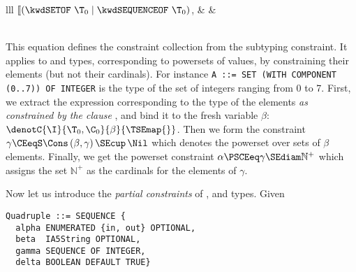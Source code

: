 \medskip

\noindent
\begin{tabular}{lll}
    $\llbracket (\kwdSETOF \,\, \T_0 \mid \kwdSEQUENCEOF \,\, \T_0)$,
  & & \\
     \\
\end{tabular}

\medskip

\noindent
This equation defines the constraint collection from the
\kwdWITHCOMPONENT{} subtyping constraint. It applies to \kwdSETOF{}
and \kwdSEQUENCEOF{} types, corresponding to powersets of values, by
constraining their elements (but not their cardinals). For instance
\texttt{\small A ::= SET (WITH COMPONENT (0..7)) OF INTEGER} is the
type of the set of integers ranging from 0 to 7. First, we extract the
expression corresponding to the type of the elements \emph{as
constrained by the clause \kwdWITHCOMPONENT}, and bind it to the fresh
variable $\beta$: $\denotC{\I}{\T_0,\C_0}{\beta}{\TSEmap{}}$. Then we
form the constraint $\gamma \CEeqS \Cons \, (\beta, \gamma) \, \SEcup
\, \Nil$ which denotes the powerset over sets of $\beta$
elements. Finally, we get the powerset constraint $\alpha \PSCEeq
\gamma\SEdiam\mathbb{N}^{+}$ which assigns the set $\mathbb{N}^{+}\!$
as the cardinals for the elements of $\gamma$.

\medskip

Now let us introduce the \emph{partial constraints} of \kwdSETOF,
\kwdSEQUENCE{} and \kwdCHOICE{} types. Given 
{\small
\begin{verbatim}
Quadruple ::= SEQUENCE {
  alpha ENUMERATED {in, out} OPTIONAL,
  beta  IA5String OPTIONAL,
  gamma SEQUENCE OF INTEGER,
  delta BOOLEAN DEFAULT TRUE}
\end{verbatim}
}

